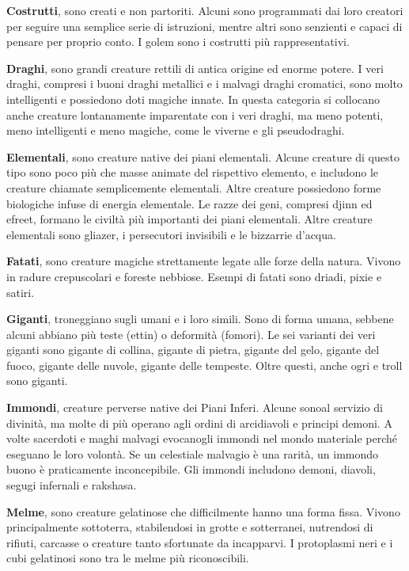 \medskip\textbf{Costrutti}, sono creati e non partoriti. Alcuni sono programmati dai loro creatori per seguire una semplice serie di istruzioni, mentre altri sono senzienti e capaci di pensare per proprio conto. I golem sono i costrutti più rappresentativi.

\medskip\textbf{Draghi}, sono grandi creature rettili di antica origine ed enorme potere. I veri draghi, compresi i buoni draghi metallici e i malvagi draghi cromatici, sono molto intelligenti e possiedono doti magiche innate. In questa categoria si collocano anche creature lontanamente imparentate con i veri draghi, ma meno potenti, meno intelligenti e meno magiche, come le viverne e gli pseudodraghi.

\medskip\textbf{Elementali}, sono creature native dei piani elementali. Alcune creature di questo tipo sono poco più che masse animate del rispettivo elemento, e includono le creature chiamate semplicemente elementali. Altre creature possiedono forme biologiche infuse di energia elementale. Le razze dei geni, compresi djinn ed efreet, formano le civiltà più importanti dei piani elementali. Altre creature elementali sono gliazer, i persecutori  invisibili e le bizzarrie d'acqua. 

\medskip\textbf{Fatati}, sono creature magiche strettamente legate alle forze della natura. Vivono in radure crepuscolari e foreste nebbiose. Esempi di fatati sono driadi, pixie e satiri.

\medskip\textbf{Giganti}, troneggiano sugli umani e i loro simili. Sono di forma umana, sebbene alcuni abbiano più teste (ettin) o deformità (fomori). Le sei varianti dei veri giganti sono gigante di collina, gigante di pietra, gigante del gelo, gigante del fuoco, gigante delle nuvole, gigante delle tempeste. Oltre questi, anche ogri e troll sono giganti. 

\medskip\textbf{Immondi}, creature perverse native dei Piani Inferi. Alcune sonoal servizio di  divinità, ma molte di più operano agli ordini di arcidiavoli e principi demoni. A volte sacerdoti e maghi malvagi evocanogli immondi nel mondo materiale perché eseguano le loro volontà. Se un celestiale malvagio è una rarità, un immondo buono è praticamente inconcepibile. Gli immondi includono demoni, diavoli, segugi infernali e rakshasa. 

\medskip\textbf{Melme}, sono creature gelatinose che difficilmente hanno una forma fissa. Vivono principalmente sottoterra, stabilendosi in grotte e sotterranei, nutrendosi di rifiuti, carcasse o creature tanto sfortunate da incapparvi. I protoplasmi neri e i cubi gelatinosi sono tra le melme più riconoscibili.

